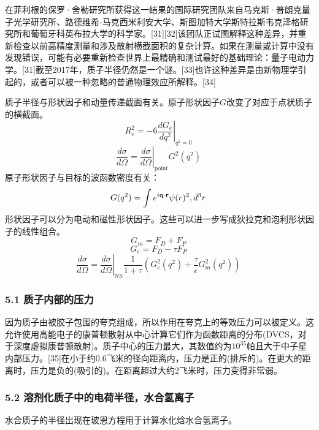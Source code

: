 在菲利根的保罗·舍勒研究所获得这一结果的国际研究团队来自马克斯·普朗克量子光学研究所、路德维希-马克西米利安大学、斯图加特大学斯特拉斯韦克泽格研究所和葡萄牙科英布拉大学的科学家。[31][32]该团队正试图解释这种差异，并重新检查以前高精度测量和涉及散射横截面积的复杂计算。如果在测量或计算中没有发现错误，可能有必要重新检查世界上最精确和测试最好的基础理论：量子电动力学。[31]截至2017年，质子半径仍然是一个谜。[33]也许这种差异是由新物理学引起的，或者可以被一种忽略的普通物理效应所解释。[34]

质子半径与形状因子和动量传递截面有关。原子形状因子$G$改变了对应于点状质子的横截面。
\begin{equation}
R_e^2 = -6 \left. \frac{d G_e}{d q^2} \right|_{q^2 = 0}~
\end{equation}
\begin{equation}
\frac{d \sigma}{d \Omega} = \left. \frac{d \sigma}{d \Omega} \right|_{\text{point}} G^2(q^2)~
\end{equation}
原子形状因子与目标的波函数密度有关：
\begin{equation}
G(q^2) = \int e^{i \mathbf{q} \cdot \mathbf{r}} \psi(r)^2 \\, d^3r~
\end{equation}
形状因子可以分为电动和磁性形状因子。这些可以进一步写成狄拉克和泡利形状因子的线性组合。
\begin{equation}
G_m = F_D + F_P~
\end{equation}
\begin{equation}
G_e = F_D - \tau F_P~
\end{equation}
\begin{equation}
\frac{d \sigma}{d \Omega} = \left. \frac{d \sigma}{d \Omega} \right|_{\text{NS}} \frac{1}{1 + \tau} \left( G_e^2(q^2) + \frac{\tau}{\epsilon} G_m^2(q^2) \right)~
\end{equation}

\subsubsection{5.1 质子内部的压力}
因为质子由被胶子包围的夸克组成，所以作用在夸克上的等效压力可以被定义。这允许使用高能电子的康普顿散射从中心计算它们作为函数距离的分布(DVCS，对于深度虚拟康普顿散射)。质子中心的压力最大，其数值约为$10^{35}$帕且大于中子星内部压力。[35]在小于约0.6飞米的径向距离内，压力是正的(排斥的)。在更大的距离时，压力是负的(吸引的)。在距离超过大约2飞米时，压力变得非常弱。

\subsubsection{5.2 溶剂化质子中的电荷半径，水合氢离子}
水合质子的半径出现在玻恩方程用于计算水化焓水合氢离子。

